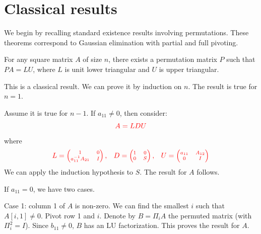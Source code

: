 \documentclass[10pt,twoside]{siamart1116}
\numberwithin{theorem}{section}
\providecommand{\DIFdel}[1]{{\protect\color{red} \scriptsize #1}} %
\providecommand{\DIFdelbegin}{} %
\begin{document}
\DIFdelbegin \section{\DIFdel{Classical results}}%
\addtocounter{section}{-1}%

\DIFdel{We begin by recalling standard existence results involving permutations. These theorems correspond to Gaussian elimination with partial and full pivoting.
}%

\DIFdel{For any square matrix $A$ of size $n$, there exists a permutation matrix $P$ such that $PA = LU$, where $L$ is unit lower triangular and $U$ is upper triangular.
}%

\DIFdel{This is a classical result. We can prove it by induction on $n$. The result is true for $n=1$.
}%

\DIFdel{Assume it is true for $n-1$. If $a_{11} \neq 0$, then consider:
	}\[
		\DIFdel{A = LDU
	}\]%
\DIFdel{where
	}\[
		\DIFdel{L = \begin{pmatrix}
			1                  & 0 \\
			a_{11}^{-1} A_{21} & I
		\end{pmatrix}, \quad
		D = \begin{pmatrix}
			1 & 0 \\
			0 & S
		\end{pmatrix}, \quad
		U = \begin{pmatrix}
			a_{11} & A_{12} \\
			0      & I
		\end{pmatrix}
	}\]%
\DIFdel{We can apply the induction hypothesis to $S$. The result for $A$ follows.
}%

\DIFdel{If $a_{11} = 0$, we have two cases.
}%

\DIFdel{Case 1: column 1 of $A$ is non-zero. We can find the smallest $i$ such that $A[i,1] \neq 0$. Pivot row 1 and $i$. Denote by $B = \Pi_i A$ the permuted matrix (with $\Pi_i^2 = I$). Since $b_{11} \neq 0$, $B$ has an LU factorization. This proves the result for $A$.
}%
\end{document}
